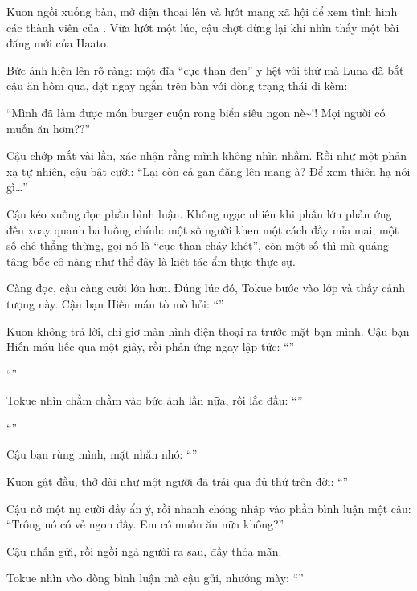 \documentclass[../main.tex]{subfiles}
\begin{document}
Kuon ngồi xuống bàn, mở điện thoại lên và lướt mạng xã hội để xem tình hình các thành viên của \hll. Vừa lướt một lúc, cậu chợt dừng lại khi nhìn thấy một bài đăng mới của Haato.

Bức ảnh hiện lên rõ ràng: một đĩa ``cục than đen'' y hệt với thứ mà Luna đã bắt cậu ăn hôm qua, đặt ngay ngắn trên bàn với dòng trạng thái đi kèm:

``Mình đã làm được món burger cuộn rong biển siêu ngon nè\~{}!! Mọi người có muốn ăn hơm??''


Cậu chớp mắt vài lần, xác nhận rằng mình không nhìn nhầm. Rồi như một phản xạ tự nhiên, cậu bật cười: ``Lại còn cả gan đăng lên mạng à? Để xem thiên hạ nói gì\dots''

Cậu kéo xuống đọc phần bình luận. Không ngạc nhiên khi phần lớn phản ứng đều xoay quanh ba luồng chính: một số người khen một cách đầy mỉa mai, một số chê thẳng thừng, gọi nó là ``cục than cháy khét'', còn một số thì mù quáng tâng bốc cô nàng như thể đây là kiệt tác ẩm thực thực sự.

Càng đọc, cậu càng cười lớn hơn. Đúng lúc đó, Tokue bước vào lớp và thấy cảnh tượng này. Cậu bạn Hiến máu tò mò hỏi: ``''

Kuon không trả lời, chỉ giơ màn hình điện thoại ra trước mặt bạn mình. Cậu bạn Hiến máu liếc qua một giây, rồi phản ứng ngay lập tức: ``''

``''

Tokue nhìn chằm chằm vào bức ảnh lần nữa, rồi lắc đầu: ``''

``''

Cậu bạn rùng mình, mặt nhăn nhó: ``''

Kuon gật đầu, thở dài như một người đã trải qua đủ thứ trên đời: ``''

Cậu nở một nụ cười đầy ẩn ý, rồi nhanh chóng nhập vào phần bình luận một câu: ``Trông nó có vẻ ngon đấy. Em có muốn ăn nữa không?''

Cậu nhấn gửi, rồi ngồi ngả người ra sau, đầy thỏa mãn.

Tokue nhìn vào dòng bình luận mà cậu gửi, nhướng mày: ``''
\end{document}
